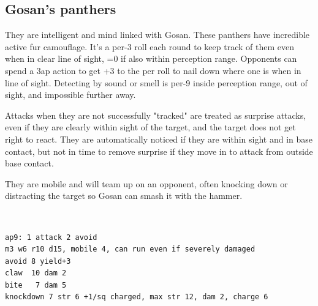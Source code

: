 \begin{samepage}
\subsection*{Gosan's panthers}
They are intelligent and mind linked with Gosan.
These panthers have incredible active fur camouflage. It's a per-3 roll each round to keep track of them even when in clear line of sight, =0 if also within perception range.
Opponents can spend a 3ap action to get +3 to the per roll to nail down where one is when in line of sight. Detecting by sound or smell is per-9 inside perception range, out of sight, and impossible further away.

Attacks when they are not successfully "tracked" are treated as surprise attacks, even if they are clearly within sight of the target, and the target does not get right to react.
They are automatically noticed if they are within sight and in base contact, but not in time to remove surprise if they move in to attack from outside base contact.

They are mobile and will team up on an opponent, often knocking down or distracting the target so Gosan can smash it with the hammer.

\

\small \begin{verbatim}
ap9: 1 attack 2 avoid
m3 w6 r10 d15, mobile 4, can run even if severely damaged
avoid 8 yield+3
claw  10 dam 2
bite   7 dam 5
knockdown 7 str 6 +1/sq charged, max str 12, dam 2, charge 6
\end{verbatim} \normalsize
\end{samepage}








